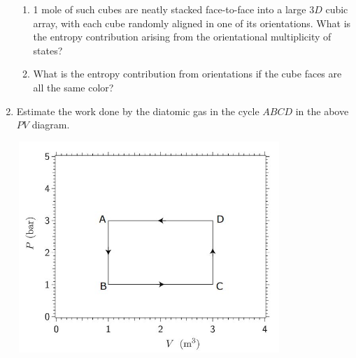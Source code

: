 \documentclass[fleqn]{article}
\begin{document}
\begin{enumerate}
\begin{enumerate}

      \item 1 mole of such cubes are neatly stacked face-to-face into a large $3D$ cubic array, with each
      cube randomly aligned in one of its orientations. What is the entropy contribution arising
      from the orientational multiplicity of states?


      \item What is the entropy contribution from orientations if the cube faces are all the same color?


    \end{enumerate}

    \item Estimate the work done by the diatomic gas in the cycle $ABCD$ in the above $PV$ diagram.

    \begin{center}
      \includegraphics[height=8cm, width=10cm]{2.JPG}
    \end{center}


  \end{enumerate}
\end{document}
